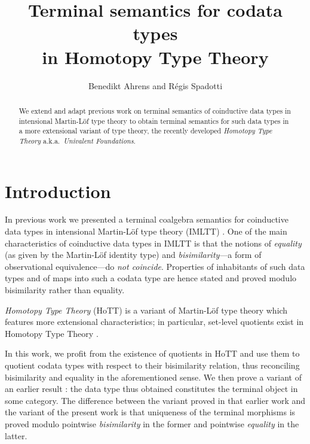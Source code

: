 \documentclass[envcountsame]{llncs}
\begin{document}
\title{Terminal semantics for codata types\\in Homotopy Type Theory}

\author{Benedikt Ahrens and R\'egis Spadotti}


\newcommand{\fat}[1]{\textbf{#1}}





\maketitle


\begin{abstract}

 We extend and adapt previous work on terminal semantics of coinductive data types in intensional Martin-Löf type theory to
 obtain terminal semantics for such data types in a more extensional variant of type theory, the recently developed 
 \emph{Homotopy Type Theory} a.k.a.\ \emph{Univalent Foundations}.
   
\end{abstract}




\section{Introduction}
 
 In previous work \parencite{trimat_coq} we presented a terminal coalgebra semantics for coinductive data types in
 intensional Martin-Löf type theory (IMLTT) \parencite{martin_lof}.
 One of the main characteristics of coinductive data types in IMLTT is that the notions of \emph{equality}
 (as given by the Martin-Löf identity type) and \emph{bisimilarity}---a form of observational equivalence---do \emph{not
 coincide}. Properties of inhabitants of such data types and of maps into such a codata type are hence stated and proved modulo bisimilarity rather than equality.
 
 \emph{Homotopy Type Theory} (HoTT) \parencite{hottbook} is a variant of Martin-Löf type theory which features more extensional 
 characteristics; in particular, set-level quotients exist in Homotopy Type Theory \parencite[Chap.\ 6.10]{hottbook}.
 
 In this work, we profit from the existence of quotients in HoTT and use them to quotient codata types with respect to their
 bisimilarity relation, thus reconciling bisimilarity and equality in the aforementioned sense.
 We then prove a variant of an earlier result \parencite{trimat_coq}: the data type thus obtained constitutes the terminal 
 object in some category.
 The difference between the variant proved in that earlier work and the variant of the present work is that uniqueness of the terminal
 morphisms is proved modulo pointwise \emph{bisimilarity} in the former and pointwise \emph{equality} in the latter.
 
\end{document}
